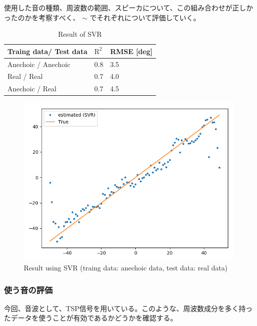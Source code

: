 使用した音の種類、周波数の範囲、スピーカについて、この組み合わせが正しかったのかを考察すべく、 $\sim$ でそれぞれについて評価していく。

\begin{table}[ht]
\caption{Result of SVR}    
\vspace{1zh}
\centering
  \begin{tabular}{|l|p{6em}|p{6em}|} \hline
    Traing data/ Test data & $\mathrm{R}^2$ & RMSE [deg] \\ \hline\hline 
    Anechoic / Anechoic & 0.8 &  3.5 \\ \hline 
    Real / Real & 0.7 &  4.0 \\ \hline
    Anechoic / Real & 0.7 &  4.5 \\ \hline
  \end{tabular}
  \label{tab:result_svr_r2_rmse}
\end{table}

\clearpage

\begin{figure}[tb]
  \begin{center}
  \vspace{1zh}
    \includegraphics[width=0.7\linewidth]{images/3_anechoic_model_real_data.png}   
  \end{center}
  \caption{Result using SVR (traing data: anechoic data, test data: real data)}
  \label{fig:result_svr_2}
\end{figure}


\subsubsection{使う音の評価}
\label{sec:result_svr_sound_kind}
今回、音波として、TSP信号を用いている。このような、周波数成分を多く持ったデータを使うことが有効であるかどうかを確認する。

